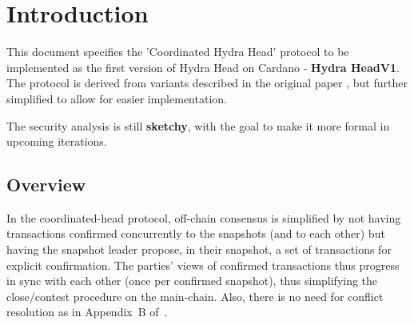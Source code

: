 \section{Introduction}
This document specifies the 'Coordinated Hydra Head' protocol to be implemented as the first version of Hydra Head on Cardano - \textbf{Hydra HeadV1}. The protocol is derived from variants described in the original paper \cite{hydrahead20}, but further simplified to allow for easier implementation.

The security analysis is still \textbf{sketchy}, with the goal to make it more formal in upcoming
iterations.

\subsection{Overview}
In the coordinated-head protocol, off-chain consensus is simplified by not having transactions
confirmed concurrently to the snapshots (and to each other) but having the snapshot leader propose,
in their snapshot, a set of transactions for explicit confirmation. The parties' views of confirmed
transactions thus progress in sync with each other (once per confirmed snapshot), thus simplifying
the close/contest procedure on the main-chain. Also, there is no need for conflict resolution as
in Appendix~B of~\cite{hydrahead20}.


